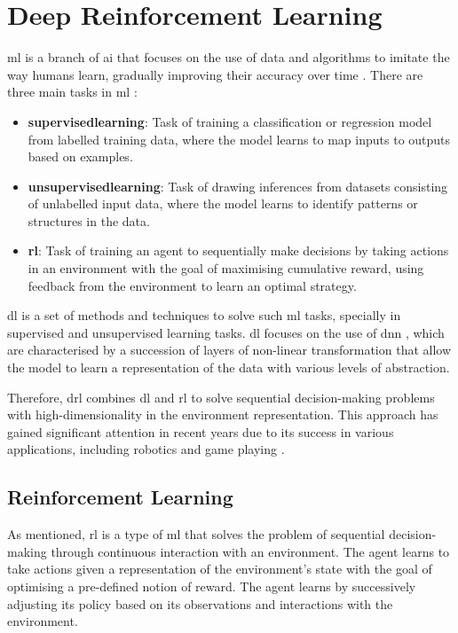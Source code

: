 \section{Deep Reinforcement Learning} \label{sec:deepreinforcementlearning}

\acrlong{ml} is a branch of \acrfull{ai} that focuses on the use of data and algorithms to imitate the way humans learn, gradually improving their accuracy over time \cite{IBM2021}. There are three main tasks in \acrshort{ml} \cite{Francois-Lavet2018}:

\begin{itemize}
    \item \textbf{\Gls{supervisedlearning}}: Task of training a classification or regression model from labelled training data, where the model learns to map inputs to outputs based on examples.
    \item \textbf{\Gls{unsupervisedlearning}}: Task of drawing inferences from datasets consisting of unlabelled input data, where the model learns to identify patterns or structures in the data.
    \item \textbf{\acrlong{rl}}: Task of training an agent to sequentially make decisions by taking actions in an environment with the goal of maximising cumulative reward, using feedback from the environment to learn an optimal strategy.
\end{itemize}

\acrlong{dl} is a set of methods and techniques to solve such \acrshort{ml} tasks, specially in supervised and unsupervised learning tasks. \acrshort{dl} focuses on the use of \acrfull{dnn} \cite{Goodfellow2016}, which are characterised by a succession of layers of non-linear transformation that allow the model to learn a representation of the data with various levels of abstraction.

Therefore, \acrfull{drl} combines \acrfull{dl} and \acrfull{rl} to solve sequential decision-making problems with high-dimensionality in the environment representation. This approach has gained significant attention in recent years due to its success in various applications, including robotics \cite{Tang2024} and game playing \cite{Silver2016, Shao2019}.

\subsection{Reinforcement Learning} \label{sec:reinforcementlearning}

As mentioned, \acrshort{rl} is a type of \acrshort{ml} that solves the problem of sequential decision-making through continuous interaction with an environment. The agent learns to take actions given a representation of the environment's state with the goal of optimising a pre-defined notion of reward. The agent learns by successively adjusting its policy based on its observations and interactions with the environment. 

